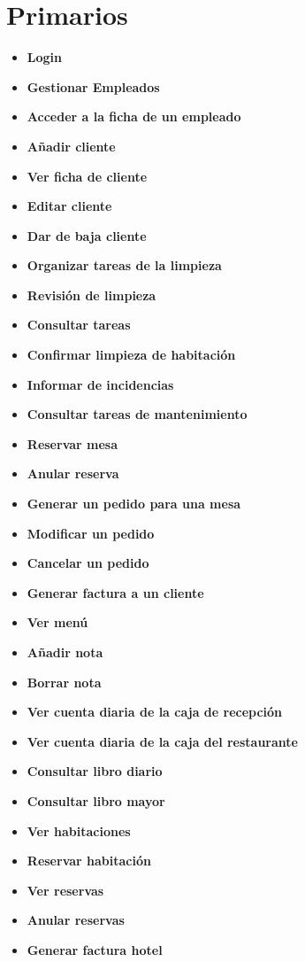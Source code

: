 \documentclass[spanish,a4paper,12pt]{report}	%
\begin{document}
\section{Primarios} 				%
	\begin{itemize}
	\item \textbf{Login}	
	\item \textbf{Gestionar Empleados}	
	\item \textbf{Acceder a la ficha de un empleado}
	\item \textbf{Añadir cliente}
	\item \textbf{Ver ficha de cliente}
	\item \textbf{Editar cliente}
	\item \textbf{Dar de baja cliente}
	\item \textbf{Organizar tareas de la limpieza}
	\item \textbf{Revisión de limpieza}
	\item \textbf{Consultar tareas}
	\item \textbf{Confirmar limpieza de habitación}
	\item \textbf{Informar de incidencias}	
	\item \textbf{Consultar tareas de  mantenimiento}
	\item \textbf{Reservar mesa}
	\item \textbf{Anular reserva}
	\item \textbf{Generar un pedido para una mesa}
	\item \textbf{Modificar un pedido}
	\item \textbf{Cancelar un pedido}
	\item \textbf{Generar factura a un cliente}
	\item \textbf{Ver menú}
	\item \textbf{Añadir nota}
	\item \textbf{Borrar nota}
	\item \textbf{Ver cuenta diaria de la caja de recepción}
	\item \textbf{Ver cuenta diaria de la caja del restaurante}
	\item \textbf{Consultar libro diario}
	\item \textbf{Consultar libro mayor}
	\item \textbf{Ver habitaciones}	
	\item \textbf{Reservar habitación}
	\item \textbf{Ver reservas}
	\item \textbf{Anular reservas}
	\item \textbf{Generar factura hotel}
	
	\end{itemize}
\end{document}
